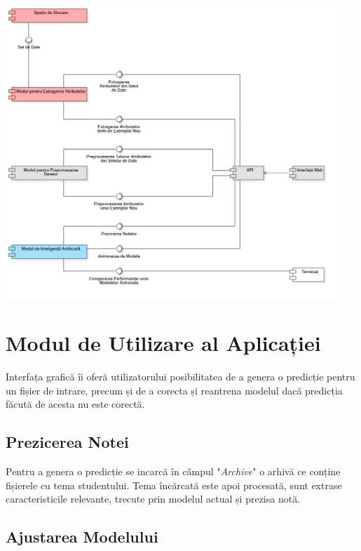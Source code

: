 \documentclass{article}
\begin{document}
\vspace{0.3cm}
\begin{center}
    \includegraphics[width=12.5cm]{images/components_diagram.png}
    \label{fig:1}
    \captionsetup{justification=centering,margin=1cm}
\end{center}
\vspace{0.3cm}

\section{Modul de Utilizare al Aplicației}

Interfața grafică îi oferă utilizatorului posibilitatea de a genera o predicție pentru un fișier de intrare, precum și de a corecta și reantrena modelul dacă predicția făcută de acesta nu este corectă.

\subsection{Prezicerea Notei}

Pentru a genera o predicție se incarcă în câmpul "\textit{Archive}" o arhivă ce conține fișierele cu tema studentului. Tema încărcată este apoi procesată, sunt extrase caracteristicile relevante, trecute prin modelul actual și prezisa notă.

\subsection{Ajustarea Modelului}
\end{document}
